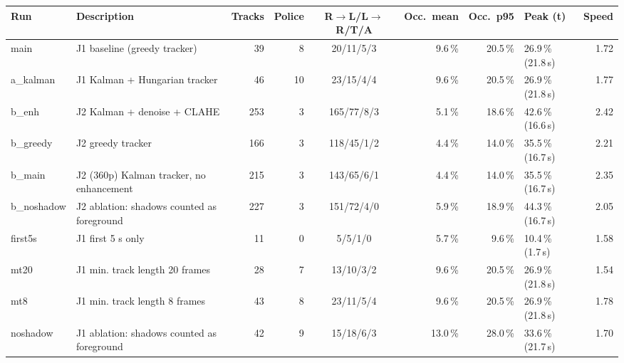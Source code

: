 \begin{tabular}{@{}l p{4.6cm} r r c r r l r@{}}
\toprule
Run & Description & Tracks & Police & R$\to$L/L$\to$R/T/A & Occ.\ mean & Occ.\ p95 & Peak (t) & Speed \\
\midrule
main & J1 baseline (greedy tracker) & 39 & 8 & 20/11/5/3 & 9.6\,\% & 20.5\,\% & 26.9\,\% (21.8\,s) & 1.72 \\
a\_kalman & J1 Kalman + Hungarian tracker & 46 & 10 & 23/15/4/4 & 9.6\,\% & 20.5\,\% & 26.9\,\% (21.8\,s) & 1.77 \\
b\_enh & J2 Kalman + denoise + CLAHE & 253 & 3 & 165/77/8/3 & 5.1\,\% & 18.6\,\% & 42.6\,\% (16.6\,s) & 2.42 \\
b\_greedy & J2 greedy tracker & 166 & 3 & 118/45/1/2 & 4.4\,\% & 14.0\,\% & 35.5\,\% (16.7\,s) & 2.21 \\
b\_main & J2 (360p) Kalman tracker, no enhancement & 215 & 3 & 143/65/6/1 & 4.4\,\% & 14.0\,\% & 35.5\,\% (16.7\,s) & 2.35 \\
b\_noshadow & J2 ablation: shadows counted as foreground & 227 & 3 & 151/72/4/0 & 5.9\,\% & 18.9\,\% & 44.3\,\% (16.7\,s) & 2.05 \\
first5s & J1 first 5 s only & 11 & 0 & 5/5/1/0 & 5.7\,\% & 9.6\,\% & 10.4\,\% (1.7\,s) & 1.58 \\
mt20 & J1 min. track length 20 frames & 28 & 7 & 13/10/3/2 & 9.6\,\% & 20.5\,\% & 26.9\,\% (21.8\,s) & 1.54 \\
mt8 & J1 min. track length 8 frames & 43 & 8 & 23/11/5/4 & 9.6\,\% & 20.5\,\% & 26.9\,\% (21.8\,s) & 1.78 \\
noshadow & J1 ablation: shadows counted as foreground & 42 & 9 & 15/18/6/3 & 13.0\,\% & 28.0\,\% & 33.6\,\% (21.7\,s) & 1.70 \\
\bottomrule
\end{tabular}
